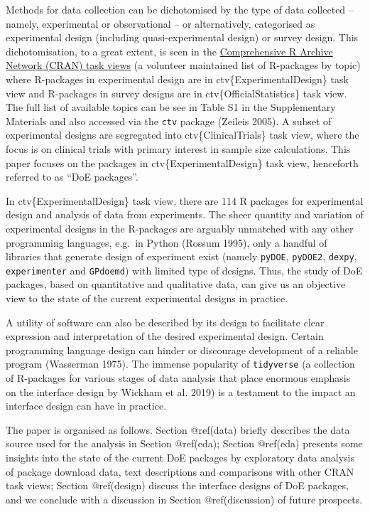 \documentclass{article}
\begin{document}
Methods for data collection can be dichotomised by the type of data
collected -- namely, experimental or observational -- or alternatively,
categorised as experimental design (including quasi-experimental design)
or survey design. This dichotomisation, to a great extent, is seen in
the \href{https://cran.r-project.org/web/views/}{Comprehensive R Archive
Network (CRAN) task views} (a volunteer maintained list of R-packages by
topic) where R-packages in experimental design are in
ctv\{ExperimentalDesign\} task view and R-packages in survey designs are
in ctv\{OfficialStatistics\} task view. The full list of available
topics can be see in Table S1 in the Supplementary Materials and also
accessed via the \texttt{ctv} package (Zeileis 2005). A subset of
experimental designs are segregated into ctv\{ClinicalTrials\} task
view, where the focus is on clinical trials with primary interest in
sample size calculations. This paper focuses on the packages in
ctv\{ExperimentalDesign\} task view, henceforth referred to as ``DoE
packages''.

In ctv\{ExperimentalDesign\} task view, there are 114 R packages for
experimental design and analysis of data from experiments. The sheer
quantity and variation of experimental designs in the R-packages are
arguably unmatched with any other programming languages, e.g.~in Python
(Rossum 1995), only a handful of libraries that generate design of
experiment exist (namely \texttt{pyDOE}, \texttt{pyDOE2},
\texttt{dexpy}, \texttt{experimenter} and \texttt{GPdoemd}) with limited
type of designs. Thus, the study of DoE packages, based on quantitative
and qualitative data, can give us an objective view to the state of the
current experimental designs in practice.

A utility of software can also be described by its design to facilitate
clear expression and interpretation of the desired experimental design.
Certain programming language design can hinder or discourage development
of a reliable program (Wasserman 1975). The immense popularity of
\texttt{tidyverse} (a collection of R-packages for various stages of
data analysis that place enormous emphasis on the interface design by
Wickham et al. 2019) is a testament to the impact an interface design
can have in practice.

The paper is organised as follows. Section @ref(data) briefly describes
the data source used for the analysis in Section @ref(eda); Section
@ref(eda) presents some insights into the state of the current DoE
packages by exploratory data analysis of package download data, text
descriptions and comparisons with other CRAN task views; Section
@ref(design) discuss the interface designs of DoE packages, and we
conclude with a discussion in Section @ref(discussion) of future
prospects.
\end{document}
